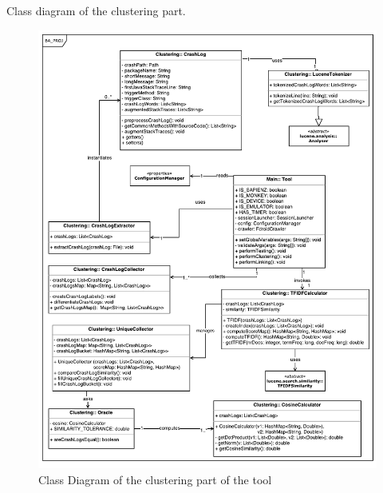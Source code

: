 Class diagram of the clustering part.
\begin{figure}[t]
\centering 
\includegraphics[width=\columnwidth]{diagrams/ClusteringClassDiagram.pdf} 
\caption{Class Diagram of the clustering part of the tool }
\label{cluseringDiagram}
\vspace{-3mm} 
\end{figure}